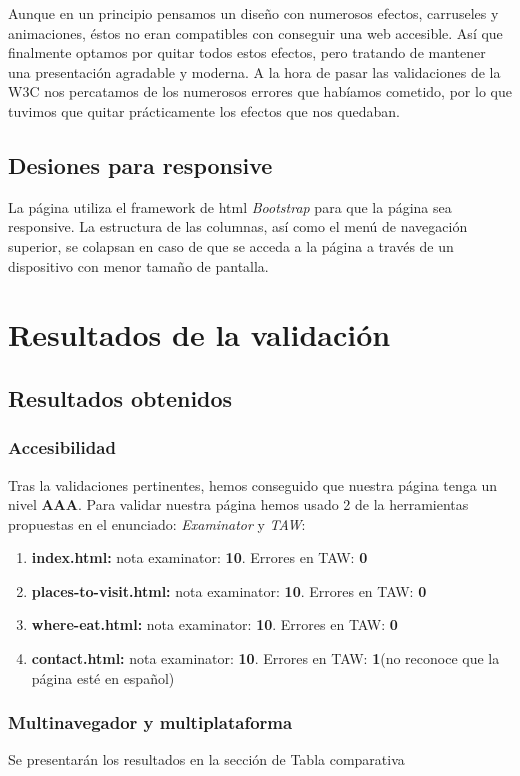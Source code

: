 Aunque en un principio pensamos un diseño con numerosos efectos, carruseles y animaciones, éstos no eran compatibles con conseguir una web accesible. Así que finalmente optamos por quitar todos estos efectos, pero tratando de mantener una presentación agradable y moderna.
A la hora de pasar las validaciones de la W3C nos percatamos de los numerosos errores que habíamos cometido, por lo que tuvimos que quitar prácticamente los efectos que nos quedaban.

\subsection{Desiones para responsive}
La página utiliza el framework de html \textit{Bootstrap} para que la página sea responsive. La estructura de las columnas, así como el menú de navegación superior, se colapsan en caso de que se acceda a la página a través de un dispositivo con menor tamaño de pantalla.
\section{Resultados de la validación}
\subsection{Resultados obtenidos}

\subsubsection{Accesibilidad}
Tras la validaciones pertinentes, hemos conseguido que nuestra página tenga un nivel \textbf{AAA}. Para validar nuestra página hemos usado 2 de la herramientas propuestas en el enunciado: \textit{Examinator} y \textit{TAW}:
\begin{enumerate}
	\item \textbf{index.html: }nota examinator: \textbf{10}. Errores en TAW: \textbf{0}
	\item \textbf{places-to-visit.html: }nota examinator: \textbf{10}. Errores en TAW: \textbf{0}
	\item \textbf{where-eat.html: }nota examinator: \textbf{10}. Errores en TAW: \textbf{0}
	\item \textbf{contact.html: }nota examinator: \textbf{10}. Errores en TAW: \textbf{1}(no reconoce que la página esté en español)
\end{enumerate}

\subsubsection{Multinavegador y multiplataforma}
Se presentarán los resultados en la sección de Tabla comparativa

